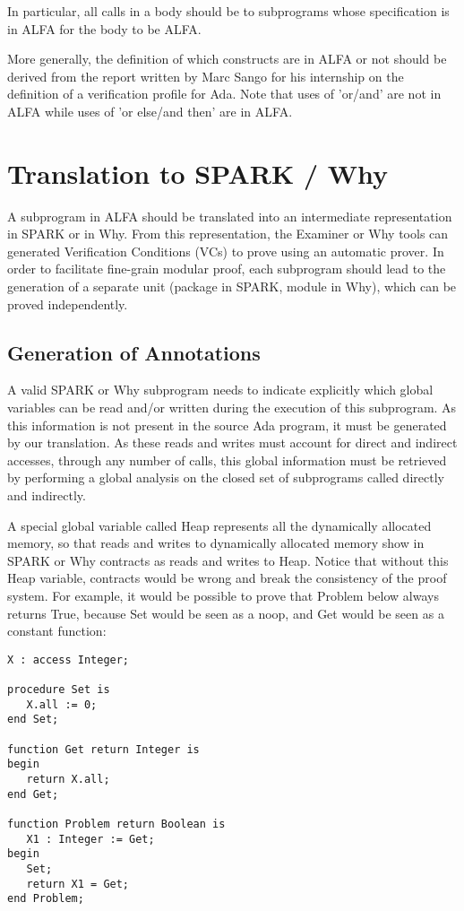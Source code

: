 \documentclass{article}
\begin{document}
In particular, all calls in a body should be to subprograms whose specification
is in ALFA for the body to be ALFA.

More generally, the definition of which constructs are in ALFA or not should be
derived from the report written by Marc Sango for his internship on the
definition of a verification profile for Ada. Note that uses of 'or/and' are
not in ALFA while uses of 'or else/and then' are in ALFA.

\section{Translation to SPARK / Why}

A subprogram in ALFA should be translated into an intermediate representation
in SPARK or in Why. From this representation, the Examiner or Why tools can
generated Verification Conditions (VCs) to prove using an automatic prover.  In
order to facilitate fine-grain modular proof, each subprogram should lead to
the generation of a separate unit (package in SPARK, module in Why), which can
be proved independently.

\subsection{Generation of Annotations}

A valid SPARK or Why subprogram needs to indicate explicitly which global
variables can be read and/or written during the execution of this
subprogram. As this information is not present in the source Ada program, it
must be generated by our translation. As these reads and writes must account
for direct and indirect accesses, through any number of calls, this global
information must be retrieved by performing a global analysis on the closed set
of subprograms called directly and indirectly.

A special global variable called Heap represents all the dynamically allocated
memory, so that reads and writes to dynamically allocated memory show in SPARK
or Why contracts as reads and writes to Heap. Notice that without this Heap
variable, contracts would be wrong and break the consistency of the proof
system. For example, it would be possible to prove that Problem below always
returns True, because Set would be seen as a noop, and Get would be seen as a
constant function:

\begin{verbatim}
X : access Integer;

procedure Set is
   X.all := 0;
end Set;

function Get return Integer is
begin
   return X.all;
end Get;

function Problem return Boolean is
   X1 : Integer := Get;
begin
   Set;
   return X1 = Get;
end Problem;
\end{verbatim}
\end{document}
